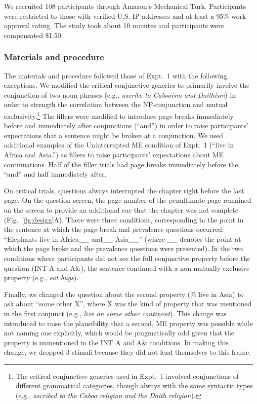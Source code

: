 \documentclass[10pt,letterpaper]{article}
\begin{document}
We recruited 108 participants through Amazon's Mechanical Turk.
Participants were restricted to those with verified U.S. IP addresses and at least a 95\% work approval rating. 
The study took about 10 minutes and participants were compensated \$1.50.

\subsubsection{Materials and procedure}

The materials and procedure  followed those of Expt.~1 with the following exceptions.
We modified the critical conjunctive generics to primarily involve the conjunction of two noun phrases (e.g., \emph{ascribe to Cabooism and Daithism}) in order to strength the correlation between the NP-conjunction and mutual exclusivity.\footnote{
The critical conjunctive generics used in Expt.~1 involved conjunctions of different grammatical categories, though always with the same syntactic types (e.g., \emph{ascribed to the Caboo religion and the Daith religion}).
}
The fillers were modified to introduce page breaks immediately before and immediately after conjunctions (``and'') in order to raise participants' expectations that a sentence might be broken at a conjunction.
We used additional examples of the Uninterrupted ME condition of Expt.~1 (``live in Africa and Asia.'') as fillers to raise participants' expectations about ME continuations.
Half of the filler trials had page breaks immediately before the ``and'' and half immediately after.

On critical trials, questions always interrupted the chapter right before the last page.
On the question screen, the page number of the penultimate page remained on the screen to provide an additional cue that the chapter was not complete (Fig.~\ref{fig:design}A).
There were three conditions, corresponding to the point in the sentence at which the page-break and prevalence questions occurred: ``Elephants live in Africa\_\_ and\_\_ Asia\_\_'' (where \_\_ denotes the point at which the page broke and the prevalence questions were presented).
In the two conditions where participants did not see the full conjunctive property before the question (INT A and A\&), the sentence continued with a non-mutually exclusive property (e.g., \emph{eat bugs}). 

Finally, we changed the question about the second property (\% live in Asia) to ask about ``some other X'', where X was the kind of property that was mentioned in the first conjunct (e.g., \emph{live on some other continent}).
This change was introduced to raise the plausibility that a second, ME property was possible while not  naming one explicitly, which would be pragmatically odd given that the property is unmentioned in the INT A and A\& conditions. 
In making this change, we dropped 3 stimuli because they did not lend themselves to this frame.
\end{document}
